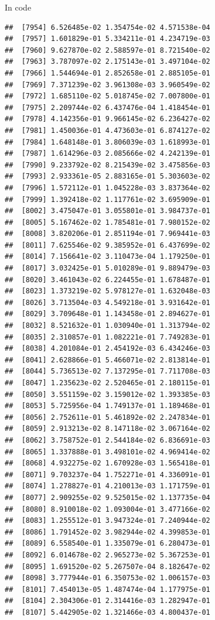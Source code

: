 \documentclass[ignorenonframetext,]{beamer}
\begin{document}
\begin{frame}[fragile]{In code}
\begin{verbatim}
##  [7954] 6.526485e-02 1.354754e-02 4.571538e-04
##  [7957] 1.601829e-01 5.334211e-01 4.234719e-03
##  [7960] 9.627870e-02 2.588597e-01 8.721540e-02
##  [7963] 3.787097e-02 2.175143e-01 3.497104e-02
##  [7966] 1.544694e-01 2.852658e-01 2.885105e-01
##  [7969] 7.371239e-02 3.961308e-03 3.960549e-02
##  [7972] 1.685110e-02 5.018745e-02 7.007800e-01
##  [7975] 2.209744e-02 6.437476e-04 1.418454e-01
##  [7978] 4.142356e-01 9.966145e-02 6.236427e-02
##  [7981] 1.450036e-01 4.473603e-01 6.874127e-02
##  [7984] 1.648148e-01 3.806039e-03 1.618993e-01
##  [7987] 1.614296e-03 2.085666e-02 4.242139e-01
##  [7990] 9.233792e-02 8.215439e-02 3.475856e-03
##  [7993] 2.933361e-05 2.883165e-01 5.303603e-02
##  [7996] 1.572112e-01 1.045228e-03 3.837364e-02
##  [7999] 1.392418e-02 1.117761e-02 3.695909e-01
##  [8002] 3.475047e-01 3.055801e-01 3.984737e-01
##  [8005] 5.167462e-02 1.785481e-01 7.980152e-02
##  [8008] 3.820206e-01 2.851194e-01 7.969441e-03
##  [8011] 7.625546e-02 9.385952e-01 6.437699e-02
##  [8014] 7.156641e-02 3.110473e-04 1.179250e-01
##  [8017] 3.032425e-01 5.010289e-01 9.889479e-03
##  [8020] 3.461043e-02 6.224455e-01 1.678487e-01
##  [8023] 1.373219e-02 5.978127e-01 1.632048e-03
##  [8026] 3.713504e-03 4.549218e-01 3.931642e-01
##  [8029] 3.709648e-01 1.143458e-01 2.894627e-01
##  [8032] 8.521632e-01 1.030940e-01 1.313794e-02
##  [8035] 2.310857e-01 1.082221e-01 7.749283e-01
##  [8038] 4.201084e-01 2.454192e-03 6.434246e-03
##  [8041] 2.628866e-01 5.466071e-02 2.813814e-01
##  [8044] 5.736513e-02 7.137295e-01 7.711708e-03
##  [8047] 1.235623e-02 2.520465e-01 2.180115e-01
##  [8050] 3.551159e-02 3.159012e-02 1.393385e-03
##  [8053] 5.725956e-04 1.749137e-01 1.189468e-01
##  [8056] 2.752611e-01 5.461892e-02 2.247834e-01
##  [8059] 2.913213e-02 8.147118e-02 3.067164e-02
##  [8062] 3.758752e-01 2.544184e-02 6.836691e-03
##  [8065] 1.337888e-01 3.498101e-02 4.969414e-02
##  [8068] 4.932275e-02 1.670928e-03 1.565418e-01
##  [8071] 9.703237e-04 1.752271e-01 4.336091e-01
##  [8074] 1.278827e-01 4.210013e-03 1.171759e-01
##  [8077] 2.909255e-02 9.525015e-02 1.137735e-04
##  [8080] 8.910018e-02 1.093004e-01 3.477166e-02
##  [8083] 1.255512e-01 3.947324e-01 7.240944e-02
##  [8086] 1.791452e-02 3.982944e-02 4.399853e-01
##  [8089] 6.558540e-01 1.335079e-01 6.280473e-01
##  [8092] 6.014678e-02 2.965273e-02 5.367253e-01
##  [8095] 1.691520e-02 5.267507e-04 8.182647e-02
##  [8098] 3.777944e-01 6.350753e-02 1.006157e-03
##  [8101] 7.454013e-05 1.487474e-04 1.177975e-01
##  [8104] 2.304306e-01 2.314416e-03 1.282947e-01
##  [8107] 5.442905e-02 1.321466e-03 4.800437e-01

\end{verbatim}
\end{frame}
\end{document}
